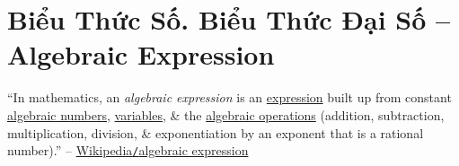 \documentclass{article}
\numberwithin{equation}{section}
\begin{document}

\section{Biểu Thức Số. Biểu Thức Đại Số -- Algebraic Expression}
``In mathematics, an \textit{algebraic expression} is an \href{https://en.wikipedia.org/wiki/Expression_(mathematics)}{expression} built up from constant \href{https://en.wikipedia.org/wiki/Algebraic_number}{algebraic numbers}, \href{https://en.wikipedia.org/wiki/Variable_(mathematics)}{variables}, \& the \href{https://en.wikipedia.org/wiki/Algebraic_operation}{algebraic operations} (addition, subtraction, multiplication, division, \& exponentiation by an exponent that is a rational number).'' -- \href{https://en.wikipedia.org/wiki/Algebraic_expression}{Wikipedia\texttt{/}algebraic expression}
\end{document}

